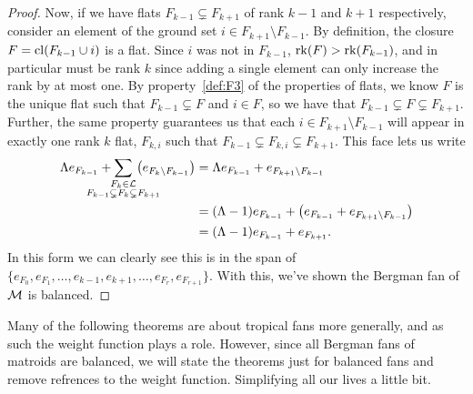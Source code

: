 \documentclass[12pt,oneside]{../../sfsuthesis}
\begin{document}
\begin{proof}
    Now, if we have flats \( F_{k-1} \subsetneq F_{k+1} \) of rank \( k-1 \) and \( k+1 \) respectively, consider an element of the ground set \( i \in F_{k+1} \setminus F_{k-1} \).
    By definition, the closure \( F = \operatorname{cl}(F_{k-1} \cup i) \) is a flat.
    Since \( i \) was not in \( F_{k-1} \), \( \operatorname{rk}(F) > \operatorname{rk}(F_{k-1}) \), and in particular must be rank \( k \) since adding a single element can only increase the rank by at most one.
    By property~\ref{def:F3} of the properties of flats, we know \( F \) is the unique flat such that \( F_{k-1} \subsetneq F \) and \( i \in F \), so we have that \( F_{k-1} \subsetneq F \subsetneq F_{k+1} \).
    Further, the same property guarantees us that each \( i \in F_{k+1} \setminus F_{k-1} \) will appear in exactly one rank \( k \) flat, \( F_{k,i} \) such that \( F_{k-1} \subsetneq F_{k,i} \subsetneq F_{k+1} \).
    This face lets us write
    \begin{align*}
        \Lambda e_{F_{k-1}} + \sum_{\mathclap{\substack{F_k \in \cL                                 \\ F_{k-1} \subsetneq F_k \subsetneq F_{k+1} }}}\, \left( e_{F_k \setminus F_{k-1}} \right)
         & = \Lambda e_{F_{k-1}} + e_{F_{k+1} \setminus F_{k-1}}                                    \\
         & = (\Lambda - 1) e_{F_{k-1}} + \left( e_{F_{k-1}} + e_{F_{k+1} \setminus F_{k-1}} \right) \\
         & = (\Lambda - 1) e_{F_{k-1}} + e_{F_{k+1}}.
    \end{align*}
    In this form we can clearly see this is in the span of \( \{ e_{F_0}, e_{F_1}, \dots, e_{k-1}, e_{k+1}, \dots, e_{F_r}, e_{F_{r+1}} \} \).
    With this, we've shown the Bergman fan of \( \mathcal{M} \) is balanced.
\end{proof}
Many of the following theorems are about tropical fans more generally, and as such the weight function plays a role.
However, since all Bergman fans of matroids are balanced, we will state the theorems just for balanced fans and remove refrences to the weight function.
Simplifying all our lives a little bit.

\end{document}
